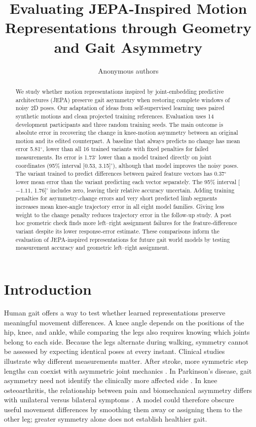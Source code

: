 \documentclass{article}
\title{Evaluating JEPA-Inspired Motion\\
Representations through Geometry\\
and Gait Asymmetry}
\author{Anonymous authors}
\newcommand{\dg}{^{\circ}}
\begin{document}
\maketitle
\begin{abstract}
We study whether motion representations inspired by joint-embedding predictive architectures (JEPA) preserve gait asymmetry when restoring complete windows of noisy 2D poses. Our adaptation of ideas from self-supervised learning uses paired synthetic motions and clean projected training references. Evaluation uses 14 development participants and three random training seeds. The main outcome is absolute error in recovering the change in knee-motion asymmetry between an original motion and its edited counterpart. A baseline that always predicts no change has mean error 5.81$\dg$, lower than all 16 trained variants with fixed penalties for failed measurements. Its error is 1.73$\dg$ lower than a model trained directly on joint coordinates (95\% interval [0.53, 3.15]$\dg$), although that model improves the noisy poses. The variant trained to predict differences between paired feature vectors has 0.37$\dg$ lower mean error than the variant predicting each vector separately. The 95\% interval [$-1.11$, 1.76]$\dg$ includes zero, leaving their relative accuracy uncertain. Adding training penalties for asymmetry-change errors and very short predicted limb segments increases mean knee-angle trajectory error in all eight model families. Giving less weight to the change penalty reduces trajectory error in the follow-up study. A post hoc geometric check finds more left--right assignment failures for the feature-difference variant despite its lower response-error estimate. These comparisons inform the evaluation of JEPA-inspired representations for future gait world models by testing measurement accuracy and geometric left--right assignment.
\end{abstract}

\section{Introduction}
Human gait offers a way to test whether learned representations preserve meaningful movement differences. A knee angle depends on the positions of the hip, knee, and ankle, while comparing the legs also requires knowing which joints belong to each side. Because the legs alternate during walking, symmetry cannot be assessed by expecting identical poses at every instant. Clinical studies illustrate why different measurements matter. After stroke, more symmetric step lengths can coexist with asymmetric joint mechanics \citep{padmanabhan2020symmetry}. In Parkinson's disease, gait asymmetry need not identify the clinically more affected side \citep{seuthe2024laterality}. In knee osteoarthritis, the relationship between pain and biomechanical asymmetry differs with unilateral versus bilateral symptoms \citep{creaby2012gait}. A model could therefore obscure useful movement differences by smoothing them away or assigning them to the other leg; greater symmetry alone does not establish healthier gait.
\end{document}
